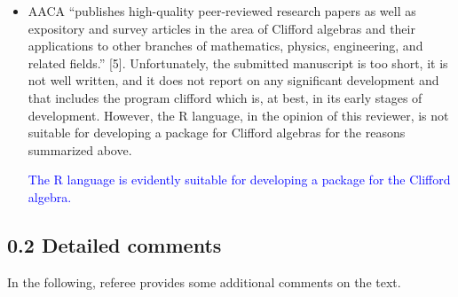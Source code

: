 \documentclass{article}
\begin{document}
\begin{itemize}
\item AACA “publishes high-quality peer-reviewed research papers as well as expository and survey
articles in the area of Clifford algebras and their applications to other branches of mathematics,
physics, engineering, and related fields.” [5]. Unfortunately, the submitted manuscript is too short,
it is not well written, and it does not report on any significant development and that includes the
program clifford which is, at best, in its early stages of development. However, the R language,
in the opinion of this reviewer, is not suitable for developing a package for Clifford algebras for the
reasons summarized above.

\textcolor{blue}{The R language is evidently suitable for developing a
  package for the Clifford algebra.}

\end{itemize}

\subsection*{0.2 Detailed comments}

In the following, referee provides some additional comments on the text.
\end{document}
